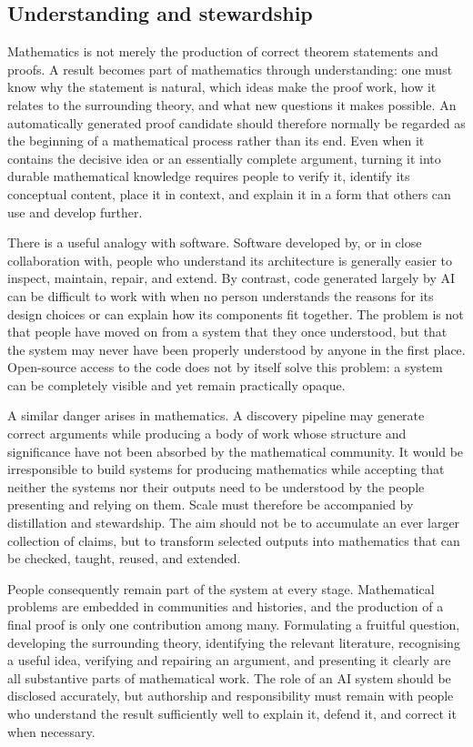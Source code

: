 \documentclass[11pt,reqno]{amsart}
\theoremstyle{plain}
\theoremstyle{definition}
\begin{document}
\subsection{Understanding and stewardship}

Mathematics is not merely the production of correct theorem statements and proofs. A result becomes part of mathematics through understanding: one must know why the statement is natural, which ideas make the proof work, how it relates to the surrounding theory, and what new questions it makes possible. An automatically generated proof candidate should therefore normally be regarded as the beginning of a mathematical process rather than its end. Even when it contains the decisive idea or an essentially complete argument, turning it into durable mathematical knowledge requires people to verify it, identify its conceptual content, place it in context, and explain it in a form that others can use and develop further.

There is a useful analogy with software. Software developed by, or in close collaboration with, people who understand its architecture is generally easier to inspect, maintain, repair, and extend. By contrast, code generated largely by AI can be difficult to work with when no person understands the reasons for its design choices or can explain how its components fit together. The problem is not that people have moved on from a system that they once understood, but that the system may never have been properly understood by anyone in the first place. Open-source access to the code does not by itself solve this problem: a system can be completely visible and yet remain practically opaque.

A similar danger arises in mathematics. A discovery pipeline may generate correct arguments while producing a body of work whose structure and significance have not been absorbed by the mathematical community. It would be irresponsible to build systems for producing mathematics while accepting that neither the systems nor their outputs need to be understood by the people presenting and relying on them. Scale must therefore be accompanied by distillation and stewardship. The aim should not be to accumulate an ever larger collection of claims, but to transform selected outputs into mathematics that can be checked, taught, reused, and extended.

People consequently remain part of the system at every stage. Mathematical problems are embedded in communities and histories, and the production of a final proof is only one contribution among many. Formulating a fruitful question, developing the surrounding theory, identifying the relevant literature, recognising a useful idea, verifying and repairing an argument, and presenting it clearly are all substantive parts of mathematical work. The role of an AI system should be disclosed accurately, but authorship and responsibility must remain with people who understand the result sufficiently well to explain it, defend it, and correct it when necessary.
\end{document}
